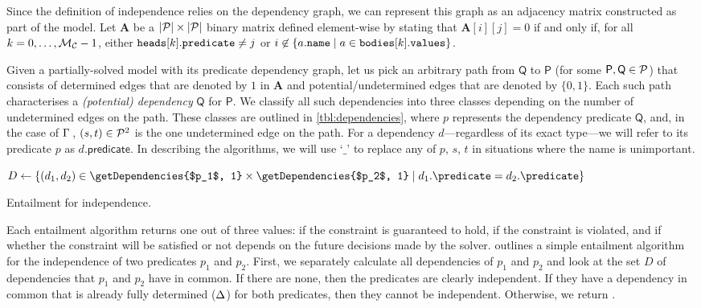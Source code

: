 Since the definition of independence relies on the dependency graph, we can
represent this graph as an adjacency matrix constructed as part of the model.
Let $\mathbf{A}$ be a $|\mathcal{P}{}| \times |\mathcal{P}{}|$ binary matrix
defined element-wise by stating that $\mathbf{A}[i][j] = 0$ if and only if, for
all $k = 0, \dots, \mathcal{M}_{\mathcal{C}}{} - 1$, either
$\texttt{\textup{heads}}[k].\texttt{\textup{predicate}} \ne j$ or $ i \not\in
\{a.\texttt{\textup{name}} \mid a \in \texttt{\textup{bodies}}[k].\texttt{\textup{values}} \}$.

Given a partially-solved model with its predicate dependency graph, let us pick
an arbitrary path from $\mathsf{Q}$ to $\mathsf{P}$ (for some $\mathsf{P},
\mathsf{Q} \in \mathcal{P}{}$) that consists of determined edges that are
denoted by $1$ in $\mathbf{A}$ and potential/undetermined edges that are
denoted by $\{ 0, 1 \}$. Each such path characterises a \emph{(potential)
  dependency} $\mathsf{Q}$ for $\mathsf{P}$. We classify all such dependencies
into three classes depending on the number of undetermined edges on the path.
These classes are outlined in \cref{tbl:dependencies}, where $p$ represents the
dependency predicate $\mathsf{Q}$, and, in the case of $\operatorname{\Gamma}{}$,
$(s, t) \in \mathcal{P}{}^2$ is the one undetermined edge on the path. For a
dependency $d$---regardless of its exact type---we will refer to its predicate
$p$ as $d.\mathsf{predicate}$. In describing the algorithms, we will use `$\_$'
to replace any of $p$, $s$, $t$ in situations where the name is unimportant.

\begin{algorithm}[t]
  $D \gets \{ (d_1, d_2) \in \getDependencies{$p_1$, 1} \times \getDependencies{$p_2$, 1} \mid d_1.\predicate = d_2.\predicate \}$\;
  \caption{Entailment for independence.}\label{alg:independence_entailment}
\end{algorithm}

Each entailment algorithm returns one out of three values: \true{} if the
constraint is guaranteed to hold, \false{} if the constraint is violated, and
\undefined{} if whether the constraint will be satisfied or not depends on the
future decisions made by the solver.  outlines
a simple entailment algorithm for the independence of two predicates $p_1$ and
$p_2$. First, we separately calculate all dependencies of $p_1$ and $p_2$ and
look at the set $D$ of dependencies that $p_1$ and $p_2$ have in common. If
there are none, then the predicates are clearly independent. If they have a
dependency in common that is already fully determined ($\operatorname{\Delta}$) for both
predicates, then they cannot be independent. Otherwise, we return \undefined{}.

